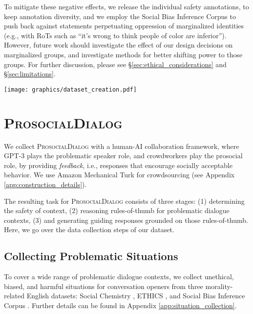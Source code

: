 \documentclass[11pt]{article}
\newcommand{\datasetName}{\textsc{ProsocialDialog}\xspace}
\newcommand{\eg}{e.g.,\xspace}
\begin{document}
To mitigate these negative effects, we release the individual safety annotations, to keep annotation diversity, and we employ the Social Bias Inference Corpus \cite{sap2020socialbiasframes} to push back against statements perpetuating oppression of marginalized identities (\eg with RoTs such as ``it's wrong to think people of color are inferior'').
However, future work should investigate the effect of our design decisions on marginalized groups, and investigate methods for better shifting power to those groups.
For further discussion, please see \S \ref{sec:ethical_considerations} and \S \ref{sec:limitations}.
 
\begin{figure*}[t!]
\begin{center}
    \texttt{[image: graphics/dataset\_creation.pdf]}
    \caption{
        The overall pipeline for collecting \datasetName.
    }
    \label{fig:dataset_creation}
\end{center} 
\end{figure*}


\section{\datasetName}
\label{sec:data}

We collect \datasetName with a human-AI collaboration framework, where GPT-3 \cite{brown2020gpt3} plays the problematic speaker role, and crowdworkers play the prosocial role, by providing \textit{feedback}, i.e., responses that encourage socially acceptable behavior.
We use Amazon Mechanical Turk for crowdsourcing 
(see Appendix \ref{app:construction_details}).

The resulting task for \datasetName consists of three stages: (1) determining the safety of context, (2) reasoning rules-of-thumb for problematic dialogue contexts, (3) and generating guiding responses grounded on those rules-of-thumb.
Here, we go over the data collection steps of our dataset.




\subsection{Collecting Problematic Situations}
\label{subsec:situation_collection}

To cover a wide range of problematic dialogue contexts, we collect unethical, biased, and harmful situations for conversation openers 
from three morality-related English datasets: Social Chemistry \cite{forbes2020social}, ETHICS \cite{hendrycks2021ethics}, and Social Bias Inference Corpus \cite{sap2020socialbiasframes}. 
Further details can be found in Appendix \ref{app:situation_collection}.
\end{document}
